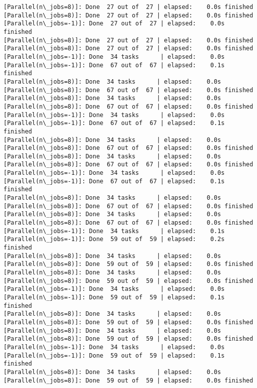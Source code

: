 \documentclass[11pt]{article}
\begin{document}
\begin{Verbatim}[commandchars=\\\{\}]
[Parallel(n\_jobs=8)]: Done  27 out of  27 | elapsed:    0.0s finished
[Parallel(n\_jobs=8)]: Done  27 out of  27 | elapsed:    0.0s finished
[Parallel(n\_jobs=-1)]: Done  27 out of  27 | elapsed:    0.0s finished
[Parallel(n\_jobs=8)]: Done  27 out of  27 | elapsed:    0.0s finished
[Parallel(n\_jobs=8)]: Done  27 out of  27 | elapsed:    0.0s finished
[Parallel(n\_jobs=-1)]: Done  34 tasks      | elapsed:    0.0s
[Parallel(n\_jobs=-1)]: Done  67 out of  67 | elapsed:    0.1s finished
[Parallel(n\_jobs=8)]: Done  34 tasks      | elapsed:    0.0s
[Parallel(n\_jobs=8)]: Done  67 out of  67 | elapsed:    0.0s finished
[Parallel(n\_jobs=8)]: Done  34 tasks      | elapsed:    0.0s
[Parallel(n\_jobs=8)]: Done  67 out of  67 | elapsed:    0.0s finished
[Parallel(n\_jobs=-1)]: Done  34 tasks      | elapsed:    0.0s
[Parallel(n\_jobs=-1)]: Done  67 out of  67 | elapsed:    0.1s finished
[Parallel(n\_jobs=8)]: Done  34 tasks      | elapsed:    0.0s
[Parallel(n\_jobs=8)]: Done  67 out of  67 | elapsed:    0.0s finished
[Parallel(n\_jobs=8)]: Done  34 tasks      | elapsed:    0.0s
[Parallel(n\_jobs=8)]: Done  67 out of  67 | elapsed:    0.0s finished
[Parallel(n\_jobs=-1)]: Done  34 tasks      | elapsed:    0.0s
[Parallel(n\_jobs=-1)]: Done  67 out of  67 | elapsed:    0.1s finished
[Parallel(n\_jobs=8)]: Done  34 tasks      | elapsed:    0.0s
[Parallel(n\_jobs=8)]: Done  67 out of  67 | elapsed:    0.0s finished
[Parallel(n\_jobs=8)]: Done  34 tasks      | elapsed:    0.0s
[Parallel(n\_jobs=8)]: Done  67 out of  67 | elapsed:    0.0s finished
[Parallel(n\_jobs=-1)]: Done  34 tasks      | elapsed:    0.1s
[Parallel(n\_jobs=-1)]: Done  59 out of  59 | elapsed:    0.2s finished
[Parallel(n\_jobs=8)]: Done  34 tasks      | elapsed:    0.0s
[Parallel(n\_jobs=8)]: Done  59 out of  59 | elapsed:    0.0s finished
[Parallel(n\_jobs=8)]: Done  34 tasks      | elapsed:    0.0s
[Parallel(n\_jobs=8)]: Done  59 out of  59 | elapsed:    0.0s finished
[Parallel(n\_jobs=-1)]: Done  34 tasks      | elapsed:    0.0s
[Parallel(n\_jobs=-1)]: Done  59 out of  59 | elapsed:    0.1s finished
[Parallel(n\_jobs=8)]: Done  34 tasks      | elapsed:    0.0s
[Parallel(n\_jobs=8)]: Done  59 out of  59 | elapsed:    0.0s finished
[Parallel(n\_jobs=8)]: Done  34 tasks      | elapsed:    0.0s
[Parallel(n\_jobs=8)]: Done  59 out of  59 | elapsed:    0.0s finished
[Parallel(n\_jobs=-1)]: Done  34 tasks      | elapsed:    0.0s
[Parallel(n\_jobs=-1)]: Done  59 out of  59 | elapsed:    0.1s finished
[Parallel(n\_jobs=8)]: Done  34 tasks      | elapsed:    0.0s
[Parallel(n\_jobs=8)]: Done  59 out of  59 | elapsed:    0.0s finished

\end{Verbatim}
\end{document}
